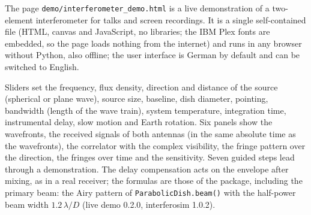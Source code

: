 The page \texttt{demo/interferometer\_demo.html} is a live demonstration of
a two-element interferometer for talks and screen recordings. It is a
single self-contained file (HTML, canvas and JavaScript, no libraries;
the IBM Plex fonts are embedded, so the page loads nothing from the
internet) and runs in any browser without Python, also offline; the user interface is German by
default and can be switched to English.

Sliders set the frequency, flux density, direction and distance of the
source (spherical or plane wave), source size, baseline, dish diameter,
pointing, bandwidth (length of the wave train), system temperature,
integration time, instrumental delay, slow motion and Earth rotation.
Six panels show the wavefronts, the received signals of both antennas
(in the same absolute time as the wavefronts), the correlator with the
complex visibility, the fringe pattern over the direction, the fringes
over time and the sensitivity. Seven guided steps lead through a
demonstration. The delay compensation acts on the envelope after mixing,
as in a real receiver; the formulas are those of the package, including
the primary beam: the Airy pattern of \texttt{ParabolicDish.beam()} with
the half-power beam width $1.2\,\lambda/D$ (live demo 0.2.0, interferosim
1.0.2).
